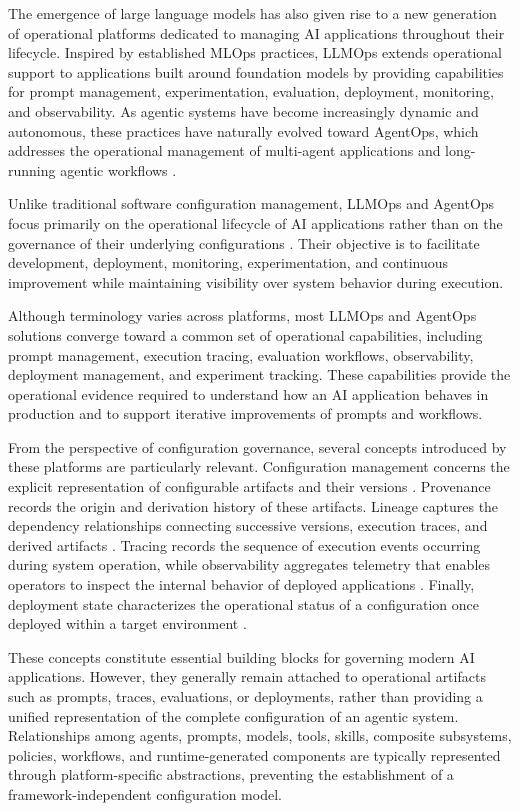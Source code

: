\documentclass[10pt]{article}
\begin{document}
The emergence of large language models has also given rise to a new generation of operational platforms dedicated to managing AI applications throughout their lifecycle. Inspired by established MLOps practices, LLMOps extends operational support to applications built around foundation models by providing capabilities for prompt management, experimentation, evaluation, deployment, monitoring, and observability. As agentic systems have become increasingly dynamic and autonomous, these practices have naturally evolved toward AgentOps, which addresses the operational management of multi-agent applications and long-running agentic workflows \cite{ref11}.

Unlike traditional software configuration management, LLMOps and AgentOps focus primarily on the operational lifecycle of AI applications rather than on the governance of their underlying configurations \cite{multiple_references5}. Their objective is to facilitate development, deployment, monitoring, experimentation, and continuous improvement while maintaining visibility over system behavior during execution.

Although terminology varies across platforms, most LLMOps and AgentOps solutions converge toward a common set of operational capabilities, including prompt management, execution tracing, evaluation workflows, observability, deployment management, and experiment tracking. These capabilities provide the operational evidence required to understand how an AI application behaves in production and to support iterative improvements of prompts and workflows.

From the perspective of configuration governance, several concepts introduced by these platforms are particularly relevant. Configuration management concerns the explicit representation of configurable artifacts and their versions \cite{ref12}. Provenance records the origin and derivation history of these artifacts. Lineage captures the dependency relationships connecting successive versions, execution traces, and derived artifacts \cite{ref13}. Tracing records the sequence of execution events occurring during system operation, while observability aggregates telemetry that enables operators to inspect the internal behavior of deployed applications \cite{ref14}. Finally, deployment state characterizes the operational status of a configuration once deployed within a target environment \cite{ref15}.

These concepts constitute essential building blocks for governing modern AI applications. However, they generally remain attached to operational artifacts such as prompts, traces, evaluations, or deployments, rather than providing a unified representation of the complete configuration of an agentic system. Relationships among agents, prompts, models, tools, skills, composite subsystems, policies, workflows, and runtime-generated components are typically represented through platform-specific abstractions, preventing the establishment of a framework-independent configuration model.
\end{document}
